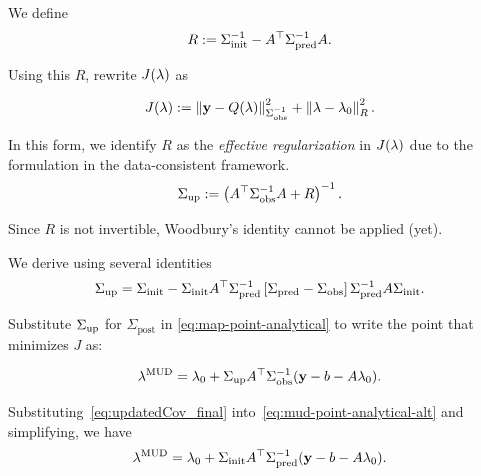 \begin{frame}

We define
\begin{equation}\label{eq:eff_reg}
	R := \nolinebreak \initialCov^{-1} - \nolinebreak A^\top \predictedCov^{-1} A.
\end{equation}

Using this $R$, rewrite $J(\lambda)$ as

\begin{equation}\label{eq:dci-objective-alt}
J(\lambda):= \left\Vert\mathbf{y} - Q(\lambda)\right\Vert_{\Sigma_\text{obs}^{-1}}^2 + \left\Vert\lambda - \lambda_0\right\Vert_{R}^2.
\end{equation}

\vskip 12pt
In this form, we identify $R$ as the {\em effective regularization} in $J(\lambda)$ due to the formulation in the data-consistent framework.
\begin{equation}
	\Sigma_\text{up} := \left(A^\top \Sigma_\text{obs}^{-1} A + R\right)^{-1}.
\end{equation}

Since $R$ is not invertible, Woodbury's identity cannot be applied (yet).
\end{frame}

\begin{frame}[t]
\centering
We derive using several identities
\begin{equation}\label{eq:updatedCov_final}
	\Sigma_\text{up} = \Sigma_\text{init} - \Sigma_\text{init} A^\top \Sigma_\text{pred}^{-1}\left[\Sigma_\text{pred}-\Sigma_\text{obs}\right]\Sigma_\text{pred}^{-1}A\Sigma_\text{init}.
\end{equation}

\vskip 12pt
Substitute $\Sigma_\text{up}$ for $\Sigma_\text{post}$ in \eqref{eq:map-point-analytical} to write the point that minimizes $J$ as:

\begin{equation}\label{eq:mud-point-analytical-alt}
\lambda^{\text{MUD}} = \lambda_0 + \Sigma_\text{up} A^\top \Sigma_\text{obs}^{-1} (\mathbf{y} - b - A\lambda_0).
\end{equation}

\vskip 12pt
Substituting~\eqref{eq:updatedCov_final} into~\eqref{eq:mud-point-analytical-alt} and simplifying, we have
\begin{equation}\label{eq:mud-point-analytical-final}
	\lambda^{\text{MUD}} = \lambda_0 + \Sigma_\text{init} A^\top \Sigma_\text{pred}^{-1}(\mathbf{y} - b - A\lambda_0).
\end{equation}

\end{frame}

